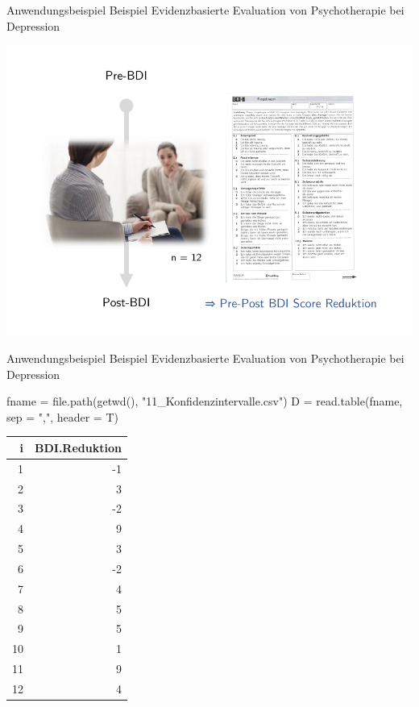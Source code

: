 \documentclass[
  8pt,
  ignorenonframetext,
]{beamer}
\newenvironment{Shaded}{\begin{snugshade}}{\end{snugshade}}
\newcommand{\AttributeTok}[1]{\textcolor[rgb]{0.77,0.63,0.00}{#1}}
\newcommand{\FunctionTok}[1]{\textcolor[rgb]{0.00,0.00,0.00}{#1}}
\newcommand{\NormalTok}[1]{#1}
\newcommand{\OtherTok}[1]{\textcolor[rgb]{0.56,0.35,0.01}{#1}}
\newcommand{\StringTok}[1]{\textcolor[rgb]{0.31,0.60,0.02}{#1}}
\begin{document}
\begin{frame}[t]{Anwendungsbeispiel}
\protect\hypertarget{anwendungsbeispiel}{}
Beispiel \textbar{} Evidenzbasierte Evaluation von Psychotherapie bei
Depression

\begin{center}\includegraphics[width=0.9\linewidth]{11_Abbildungen/wtfi_11_messplan} \end{center}
\end{frame}

\begin{frame}[fragile,t]{Anwendungsbeispiel}
\protect\hypertarget{anwendungsbeispiel-1}{}
Beispiel \textbar{} Evidenzbasierte Evaluation von Psychotherapie bei
Depression

\small
\vspace{2mm}

\footnotesize

\begin{Shaded}
\begin{Highlighting}[]
\NormalTok{fname }\OtherTok{=} \FunctionTok{file.path}\NormalTok{(}\FunctionTok{getwd}\NormalTok{(), }\StringTok{"11\_Konfidenzintervalle.csv"}\NormalTok{)}
\NormalTok{D     }\OtherTok{=} \FunctionTok{read.table}\NormalTok{(fname, }\AttributeTok{sep =} \StringTok{","}\NormalTok{, }\AttributeTok{header =}\NormalTok{ T)}
\end{Highlighting}
\end{Shaded}

\vspace{2mm}

\begin{longtable}[]{@{}rr@{}}
\toprule()
i & BDI.Reduktion \\
\midrule()
\endhead
1 & -1 \\
2 & 3 \\
3 & -2 \\
4 & 9 \\
5 & 3 \\
6 & -2 \\
7 & 4 \\
8 & 5 \\
9 & 5 \\
10 & 1 \\
11 & 9 \\
12 & 4 \\
\bottomrule()
\end{longtable}
\end{frame}
\end{document}
